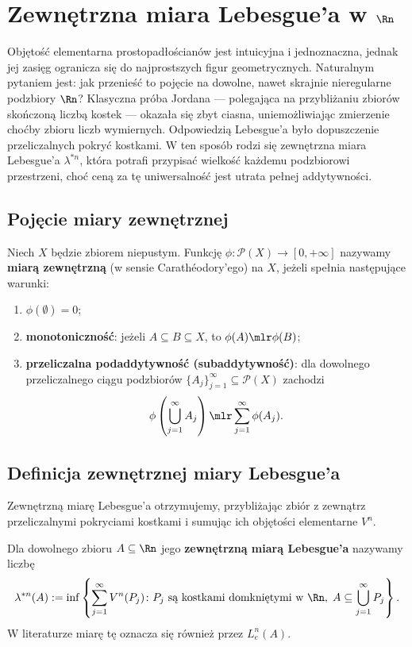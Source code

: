 \section{Zewnętrzna miara Lebesgue'a w $\Rn$}

Objętość elementarna prostopadłościanów jest intuicyjna i jednoznaczna, jednak jej zasięg ogranicza się do najprostszych figur geometrycznych. Naturalnym pytaniem jest: jak przenieść to pojęcie na dowolne, nawet skrajnie nieregularne podzbiory $\Rn$? Klasyczna próba Jordana — polegająca na przybliżaniu zbiorów skończoną liczbą kostek — okazała się zbyt ciasna, uniemożliwiając zmierzenie choćby zbioru liczb wymiernych. Odpowiedzią Lebesgue'a było dopuszczenie przeliczalnych pokryć kostkami. W ten sposób rodzi się zewnętrzna miara Lebesgue'a $\lambda^{*n}$, która potrafi przypisać wielkość każdemu podzbiorowi przestrzeni, choć ceną za tę uniwersalność jest utrata pełnej addytywności.

\subsection{Pojęcie miary zewnętrznej}

\begin{defi}
    Niech $X$ będzie zbiorem niepustym. Funkcję $\phi \colon \mathcal{P}(X) \to [0, +\infty]$ nazywamy \textbf{miarą zewnętrzną} (w sensie Carathéodory'ego) na $X$, jeżeli spełnia następujące warunki:
    \begin{enumerate}
        \item[(i)] $\phi(\emptyset) = 0$;
        \item[(ii)] \textbf{monotoniczność}: jeżeli $A \subseteq  B \subseteq  X$, to $\phi(A) \mlr \phi(B)$;
        \item[(iii)] \textbf{przeliczalna podaddytywność (subaddytywność)}: dla dowolnego przeliczalnego ciągu podzbiorów $\{A_j\}_{j=1}^\infty \subseteq \mathcal{P}(X)$ zachodzi
              \begin{equation*}
                  \phi\left(\bigcup_{j=1}^\infty A_j\right) \mlr \sum_{j=1}^\infty \phi(A_j).
              \end{equation*}
    \end{enumerate}
\end{defi}

\subsection{Definicja zewnętrznej miary Lebesgue'a} Zewnętrzną miarę Lebesgue'a otrzymujemy, przybliżając zbiór z zewnątrz przeliczalnymi pokryciami kostkami i sumując ich objętości elementarne $V^n$.
\begin{defi}
    Dla dowolnego zbioru $A \subseteq \Rn$ jego \textbf{zewnętrzną miarą Lebesgue'a} nazywamy liczbę
    \begin{equation*}
        \lambda^{*n}(A) := \inf \left\{ \sum_{j=1}^\infty V^n(P_j) \colon P_j \text{ są kostkami domkniętymi w } \Rn, \; A \subseteq \bigcup_{j=1}^\infty P_j \right\}.
    \end{equation*}
    W literaturze miarę tę oznacza się również przez $L_e^n(A)$.
\end{defi}


